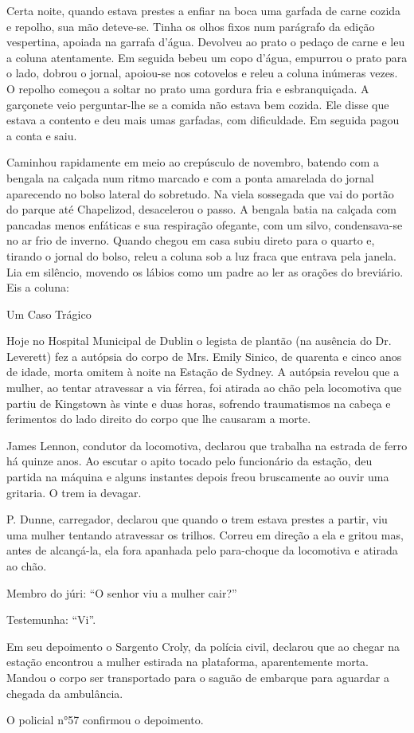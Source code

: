 Certa noite, quando estava prestes a enfiar na boca uma garfada de
carne cozida e repolho, sua mão deteve-se. Tinha os olhos fixos num
parágrafo da edição vespertina, apoiada na garrafa d'água. Devolveu ao
prato o pedaço de carne e leu a coluna atentamente. Em seguida bebeu
um copo d'água, empurrou o prato para o lado, dobrou o jornal,
apoiou-se nos cotovelos e releu a coluna inúmeras vezes. O repolho
começou a soltar no prato uma gordura fria e esbranquiçada. A
garçonete veio perguntar-lhe se a comida não estava bem cozida. Ele
disse que estava a contento e deu mais umas garfadas, com dificuldade.
Em seguida pagou a conta e saiu.

Caminhou rapidamente em meio ao crepúsculo de novembro, batendo com a
bengala na calçada num ritmo marcado e com a ponta amarelada do jornal
aparecendo no bolso lateral do sobretudo. Na viela sossegada que vai
do portão do parque até Chapelizod, desacelerou o passo. A bengala
batia na calçada com pancadas menos enfáticas e sua respiração
ofegante, com um
silvo, condensava-se no ar frio de inverno. Quando chegou em casa
subiu direto para o quarto e, tirando o jornal do bolso, releu a
coluna sob a luz fraca que entrava pela janela. Lia em silêncio,
movendo os lábios como um padre ao ler as orações do breviário. Eis a
coluna:

{\itshape
{}

{\centering
Um Caso Trágico
\par}

Hoje no Hospital Municipal de Dublin o legista de plantão (na ausência
do Dr. Leverett) fez a autópsia do corpo de Mrs. Emily Sinico, de
quarenta e cinco anos de idade, morta omitem à noite na Estação de
Sydney. A autópsia revelou que a mulher, ao tentar atravessar a via
férrea, foi atirada ao chão pela locomotiva que partiu de Kingstown
às vinte e duas horas, sofrendo traumatismos na cabeça e ferimentos do
lado direito do corpo que lhe causaram a morte.

James Lennon, condutor da locomotiva, declarou que trabalha na estrada
de ferro há quinze anos. Ao escutar o apito tocado pelo funcionário da
estação, deu partida na máquina e alguns instantes depois freou
bruscamente ao ouvir uma gritaria. O trem ia devagar.

P. Dunne, carregador, declarou que quando o trem estava prestes a
partir, viu uma mulher tentando atravessar os trilhos. Correu em
direção a ela e gritou mas, antes de alcançá-la, ela fora apanhada
pelo para-choque da locomotiva e atirada ao chão.

Membro do júri: ``O senhor viu a mulher cair?''

Testemunha: ``Vi''.

Em seu depoimento o Sargento Croly, da polícia civil, declarou que ao
chegar na estação encontrou a mulher estirada na plataforma,
aparentemente morta. Mandou o corpo ser transportado para o saguão de
embarque para aguardar a chegada da ambulância.

O policial n°57 confirmou o depoimento.
\par}

